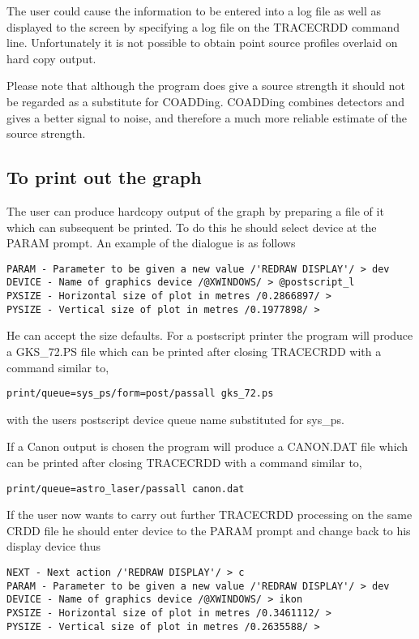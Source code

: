 The user could cause the information to be entered into a log file as well as
displayed to the screen by specifying a log file on the TRACECRDD command line.
Unfortunately it is not possible to obtain point source profiles overlaid on
hard copy output.

Please note that although the program does give a source strength it should not 
be regarded as a substitute for COADDing. COADDing combines detectors and gives 
a better signal to noise, and therefore a much more reliable estimate of the 
source strength.
\subsection{To print out the graph}
The user can produce hardcopy output of the graph by preparing a file of it
which can subsequent be printed. To do this he should select device at the
PARAM prompt. An example of the dialogue is as follows
\begin{small}
\begin{verbatim}
PARAM - Parameter to be given a new value /'REDRAW DISPLAY'/ > dev
DEVICE - Name of graphics device /@XWINDOWS/ > @postscript_l
PXSIZE - Horizontal size of plot in metres /0.2866897/ > 
PYSIZE - Vertical size of plot in metres /0.1977898/ > 
\end{verbatim}
\end{small}
He can accept the size defaults. For a postscript printer the program will
produce a GKS\_72.PS file which can be printed after closing TRACECRDD with a 
command similar to, 
\begin{small}
\begin{verbatim}
print/queue=sys_ps/form=post/passall gks_72.ps
\end{verbatim}
\end{small}
with the users postscript device queue name substituted for sys\_ps.

If a Canon output is chosen the program will produce a CANON.DAT file which can
be printed after closing TRACECRDD with a command similar to,
\begin{small}
\begin{verbatim}
print/queue=astro_laser/passall canon.dat
\end{verbatim}
\end{small}
If the user now wants to carry out further TRACECRDD processing on the same CRDD
file he should enter device to the PARAM prompt and change back to his display
device thus
\begin{small}
\begin{verbatim}
NEXT - Next action /'REDRAW DISPLAY'/ > c
PARAM - Parameter to be given a new value /'REDRAW DISPLAY'/ > dev
DEVICE - Name of graphics device /@XWINDOWS/ > ikon
PXSIZE - Horizontal size of plot in metres /0.3461112/ > 
PYSIZE - Vertical size of plot in metres /0.2635588/ > 
\end{verbatim}
\end{small}
